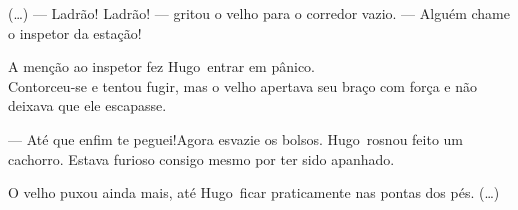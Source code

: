 \documentclass[12pt]{memoir}
\begin{document}
\title {\textbf{}}
\author {\textit{}}
\date{}
\maketitle
\newpage

\newcommand{\omenino}{Hugo}

\LARGE (\ldots) --- Ladrão! Ladrão! --- gritou o velho para o corredor vazio. --- Alguém chame o inspetor da estação! 

A menção ao inspetor fez \omenino\ entrar em pânico.\\ Contorceu-se e tentou fugir, mas o velho apertava seu braço com força e não deixava que ele escapasse. 

--- Até que enfim te peguei!Agora esvazie os bolsos. \omenino\ rosnou feito um cachorro. Estava furioso consigo mesmo por ter sido apanhado. 

O velho puxou ainda mais, até \omenino\ ficar praticamente nas pontas dos pés. (\ldots) 
\end{document}
